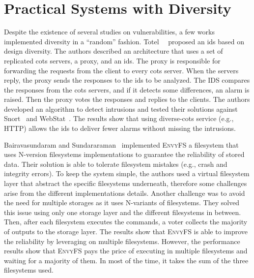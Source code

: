 \section{Practical Systems with Diversity}
Despite the existence of several studies on vulnerabilities, a few works implemented diversity in a ``random'' fashion.
Totel~\etal{}~\cite{Totel:2005} proposed an \gls{ids} based on design diversity.
The authors described an architecture that uses a set of replicated \gls{cots} servers, a proxy, and an \gls{ids}. 
The proxy is responsible for forwarding the requests from the client to every \gls{cots} server. 
When the servers reply, the proxy sends the responses to the \gls{ids} to be analyzed. 
The IDS compares the responses from the \gls{cots} servers, and if it detects some differences, an alarm is raised. 
Then the proxy votes the responses and replies to the clients. 
The authors developed an algorithm to detect intrusions and tested their solutions against Snort~\cite{snort} and WebStat~\cite{Vigna:2003}. 
The results show that using diverse-\gls{cots} service (e.g., HTTP) allows the \gls{ids} to deliver fewer alarms without missing the intrusions.

Bairavasundaram and Sundararaman~\cite{Bairavasundaram:2009} implemented \textsc{EnvyFS} a filesystem that uses N-version filesystems implementations to guarantee the reliability of stored data.
Their solution is able to tolerate filesystem mistakes (e.g., crash and integrity errors). 
To keep the system simple, the authors used a virtual filesystem layer that abstract the specific filesystems underneath, therefore some challenges arise from the different implementations details.
Another challenge was to avoid the need for multiple storages as it uses N-variants of filesystems. 
They solved this issue using only one storage layer and the different filesystems in between. 
Then, after each filesystem executes the commands, a voter collects the majority of outputs to the storage layer.
The results show that \textsc{EnvyFS} is able to improve the reliability by leveraging on multiple filesystems.
However, the performance results show that \textsc{EnvyFS} pays the price of executing in multiple filesystems and waiting for a majority of them. 
In most of the time, it takes the sum of the three filesystems used.

